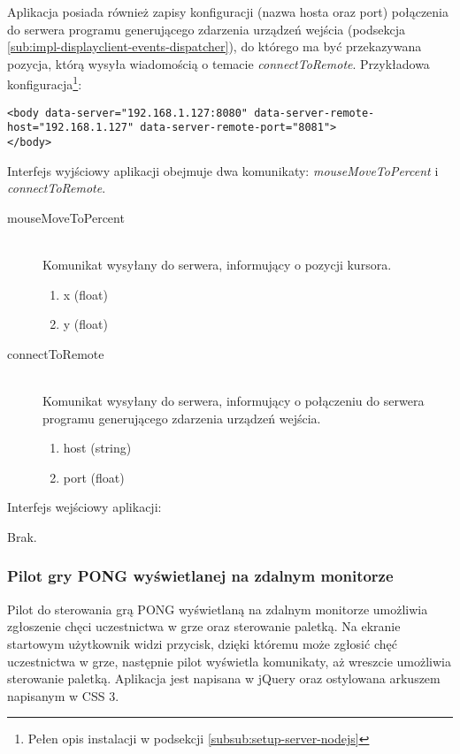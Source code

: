 Aplikacja posiada również zapisy konfiguracji (nazwa hosta oraz port) połączenia do serwera programu generującego zdarzenia urządzeń wejścia (podsekcja \ref{sub:impl-displayclient-events-dispatcher}), do którego ma być przekazywana pozycja, którą wysyła wiadomością o temacie \emph{connectToRemote}. Przykładowa konfiguracja\footnote{Pełen opis instalacji w podsekcji \ref{subsub:setup-server-nodejs}}:

\lstset{language=HTML}
\begin{lstlisting}
<body data-server="192.168.1.127:8080" data-server-remote-host="192.168.1.127" data-server-remote-port="8081">
</body>
\end{lstlisting}

Interfejs wyjściowy aplikacji obejmuje dwa komunikaty: \emph{mouseMoveToPercent} i \emph{connectToRemote}.

\begin{description}
	\item[mouseMoveToPercent] \hfill \\
	Komunikat wysyłany do serwera, informujący o pozycji kursora.
	\begin{enumerate}
		\item x (float)
		\item y (float)
	\end{enumerate}
\end{description}

\begin{description}
	\item[connectToRemote] \hfill \\
	Komunikat wysyłany do serwera, informujący o połączeniu do serwera programu generującego zdarzenia urządzeń wejścia.
	\begin{enumerate}
		\item host (string)
		\item port (float)
	\end{enumerate}
\end{description}

Interfejs wejściowy aplikacji:

Brak.

\subsubsection{Pilot gry PONG wyświetlanej na zdalnym monitorze}

Pilot do sterowania grą PONG wyświetlaną na zdalnym monitorze umożliwia zgłoszenie chęci uczestnictwa w grze oraz sterowanie paletką. Na ekranie startowym użytkownik widzi przycisk, dzięki któremu może zgłosić chęć uczestnictwa w grze, następnie pilot wyświetla komunikaty, aż wreszcie umożliwia sterowanie paletką. Aplikacja jest napisana w jQuery oraz ostylowana arkuszem napisanym w CSS 3.

